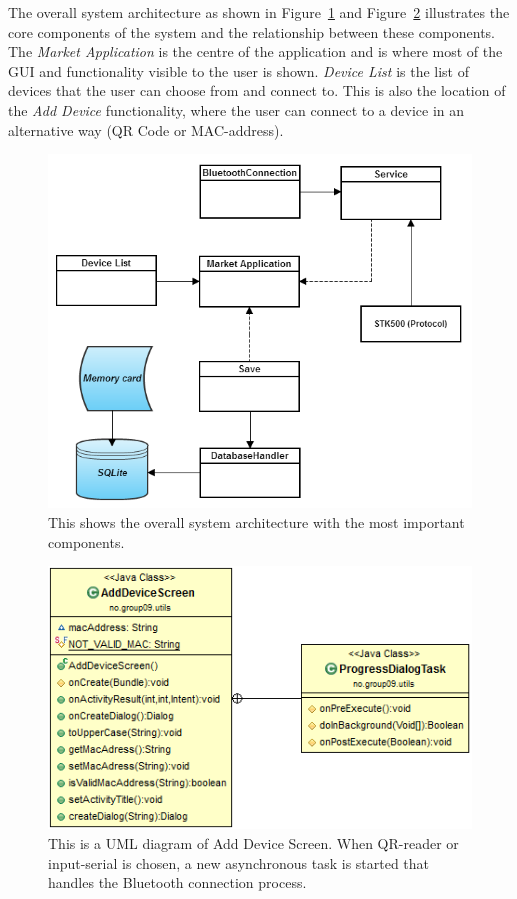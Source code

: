 	The overall system architecture as shown in Figure~\ref{fig:systemarchitecture} and Figure~\ref{fig:adddevicescreenuml} illustrates the core components of the system and the relationship between these components. The \textit{Market Application} is the centre of the application and is where most of the GUI and functionality visible to the user is shown. \textit{Device List} is the list of devices that the user can choose from and connect to. This is also the location of the \textit{Add Device} functionality, where the user can connect to a device in an alternative way (QR Code or MAC-address).\\

	\begin{figure}[H]
	\centering
	\includegraphics[scale=0.8]{images/System_architecture.png}
	\caption[System Architecture]{This shows the overall system architecture with the most important components.}
	\label{fig:systemarchitecture}
	\end{figure}

	\begin{figure}[H]
	\centering
	\includegraphics[scale=0.85]{images/UML/adddevicescreen.png}
	\caption[UML - AddDeviceScreen]{This is a UML diagram of Add Device Screen. When QR-reader or input-serial is chosen, a new asynchronous task is started that handles the Bluetooth connection process.}
	\label{fig:adddevicescreenuml}
	\end{figure}

